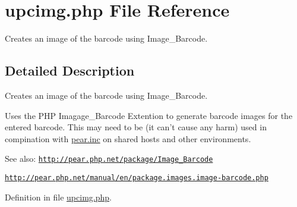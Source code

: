 \hypertarget{upcimg_8php}{
\section{upcimg.php File Reference}
\label{upcimg_8php}
}
Creates an image of the barcode using Image\_\-Barcode. 



\subsection{Detailed Description}
Creates an image of the barcode using Image\_\-Barcode. 

Uses the PHP Imagage\_\-Barcode Extention to generate barcode images for the entered barcode. This may need to be (it can't cause any harm) used in compination with \hyperlink{pear_8inc}{pear.inc} on shared hosts and other environments. \begin{Desc}
\item[See also:]\href{http://pear.php.net/package/Image_Barcode}{\tt http://pear.php.net/package/Image\_\-Barcode} 

\href{http://pear.php.net/manual/en/package.images.image-barcode.php}{\tt http://pear.php.net/manual/en/package.images.image-barcode.php} \end{Desc}


Definition in file \hyperlink{upcimg_8php-source}{upcimg.php}.